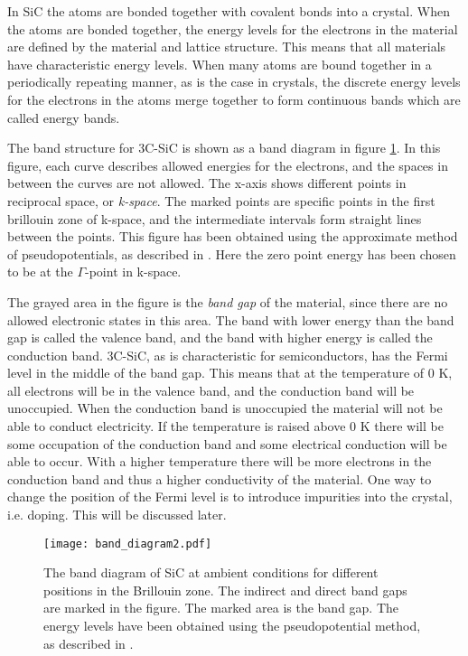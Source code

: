 In SiC the atoms are bonded together with covalent bonds into a crystal. When the atoms are bonded together, the energy levels for the electrons in the material are defined by the material and lattice structure. This means that all materials have characteristic energy levels. When many atoms are bound together in a periodically repeating manner, as is the case in crystals, the discrete energy levels for the electrons in the atoms merge together to form continuous bands which are called energy bands. 

The band structure for 3C-SiC is shown as a band diagram in figure \ref{fig:band}. In this figure, each curve describes allowed energies for the electrons, and the spaces in between the curves are not allowed. The x-axis shows different points in reciprocal space, or \emph{k-space}. The marked points are specific points in the first brillouin zone of k-space, and the intermediate intervals form straight lines between the points. This figure has been obtained using the approximate method of pseudopotentials, as described in \cite{Aourag1994}. Here the zero point energy has been chosen to be at the $\Gamma$-point in k-space. 

The grayed area in the figure is the \emph{band gap} of the material, since there are no allowed electronic states in this area. The band with lower energy than the band gap is called the valence band, and the band with higher energy is called the conduction band. 3C-SiC, as is characteristic for semiconductors, has the Fermi level in the middle of the band gap. This means that at the temperature of 0 K, all electrons will be in the valence band, and the conduction band will be unoccupied. When the conduction band is unoccupied the material will not be able to conduct electricity. If the temperature is raised above 0 K there will be some occupation of the conduction band and some electrical conduction will be able to occur. With a higher temperature there will be more electrons in the conduction band and thus a higher conductivity of the material. One way to change the position of the Fermi level is to introduce impurities into the crystal, i.e. doping. This will be discussed later. 

\begin{figure}[h]
\begin{center}
\texttt{[image: band\_diagram2.pdf]}
\caption{The band diagram of SiC at ambient conditions for different positions in the Brillouin zone. The indirect and direct band gaps are marked in the figure. The marked area is the band gap. The energy levels have been obtained using the pseudopotential method, as described in \cite{Aourag1994}.
\label{fig:band}}
\end{center}
\end{figure}

